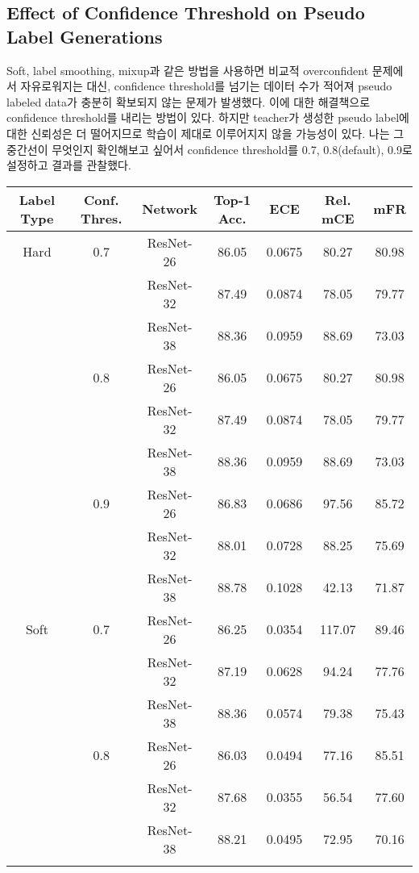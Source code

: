 \subsection{Effect of Confidence Threshold on Pseudo Label Generations}

Soft, label smoothing, mixup과 같은 방법을 사용하면 비교적 overconfident 문제에서 자유로워지는 대신, confidence threshold를 넘기는 데이터 수가 적어져 pseudo labeled data가 충분히 확보되지 않는 문제가 발생했다. 이에 대한 해결책으로 confidence threshold를 내리는 방법이 있다. 하지만 teacher가 생성한 pseudo label에 대한 신뢰성은 더 떨어지므로 학습이 제대로 이루어지지 않을 가능성이 있다. 나는 그 중간선이 무엇인지 확인해보고 싶어서 confidence threshold를 0.7, 0.8(default), 0.9로 설정하고 결과를 관찰했다.

\begin{table}[!h]
  \center 
  \begin{tabular}{|c|c|c|c|c|c|c|}
    \hline
    Label Type & Conf. Thres. & Network & Top-1 Acc. & ECE & Rel. mCE & mFR \\ \hline
    Hard & 0.7 & ResNet-26 & 86.05 & 0.0675 & 80.27 & 80.98 \\
     &  & ResNet-32 & 87.49 & 0.0874 & 78.05 & 79.77 \\
     &  & ResNet-38 & 88.36 & 0.0959 & 88.69 & 73.03 \\ \hhline{|~|-|-|-|-|-|-|}
     & 0.8 & ResNet-26 & 86.05 & 0.0675 & 80.27 & 80.98 \\
     &  & ResNet-32 & 87.49 & 0.0874 & 78.05 & 79.77 \\
     &  & ResNet-38 & 88.36 & 0.0959 & 88.69 & 73.03 \\ \hhline{|~|-|-|-|-|-|-|}
     & 0.9 & ResNet-26 & 86.83 & 0.0686 & 97.56 & 85.72 \\
     &  & ResNet-32 & 88.01 & 0.0728 & 88.25 & 75.69 \\
     &  & ResNet-38 & 88.78 & 0.1028 & 42.13 & 71.87 \\ \hline
    Soft & 0.7 & ResNet-26 & 86.25 & 0.0354 & 117.07 & 89.46 \\
     &  & ResNet-32 & 87.19 & 0.0628 & 94.24 & 77.76 \\
     &  & ResNet-38 & 88.36 & 0.0574 & 79.38 & 75.43 \\ \hhline{|~|-|-|-|-|-|-|}
     & 0.8 & ResNet-26 & 86.03 & 0.0494 & 77.16 & 85.51 \\
     &  & ResNet-32 & 87.68 & 0.0355 & 56.54 & 77.60 \\
     &  & ResNet-38 & 88.21 & 0.0495 & 72.95 & 70.16 \\ \hhline{|~|-|-|-|-|-|-|}

\end{tabular}
\end{table}
